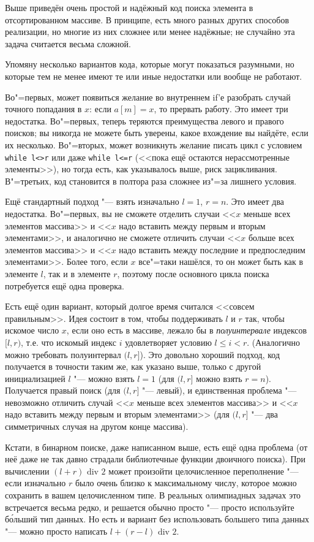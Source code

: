 \documentclass[a4paper,10pt]{problems}
\begin{document}
Выше приведён очень простой и надёжный код поиска элемента в отсортированном массиве.
В принципе, есть много разных других способов реализации, но многие из них сложнее
или менее надёжные; не случайно эта задача считается весьма сложной.

Упомяну несколько вариантов кода, которые могут показаться разумными, но которые тем не менее 
имеют те или иные недостатки или вообще не работают.

Во"=первых, может появиться желание во внутреннем if'е разобрать случай точного попадания в $x$:
если $a[m]=x$, то прервать работу. Это имеет три недостатка. 
Во"=первых, теперь теряются преимущества левого и правого поисков; вы никогда не можете
быть уверены, какое вхождение вы найдёте, если их несколько.
Во"=вторых, может возникнуть желание писать цикл с условием \verb`while l<>r` или даже
\verb`while l<=r` (<<пока ещё остаются нерассмотренные элементы>>), 
но тогда есть, как указывалось выше, риск зацикливания.
В"=третьих, код становится в полтора раза сложнее из"=за лишнего условия.

Ещё стандартный подход "--- взять изначально $l=1$, $r=n$. Это имеет два недостатка. 
Во"=первых, вы не сможете отделить случаи <<$x$ меньше всех элементов массива>> и 
<<$x$ надо вставить между первым и вторым элементами>>, 
и аналогично не сможете отличить случаи <<$x$ больше всех элементов массива>> и 
<<$x$ надо вставить между последние и предпоследним элементами>>.
Более того, если $x$ все"=таки нашёлся, то он может быть как в элементе $l$,
так и в элементе $r$, поэтому после основного цикла поиска потребуется ещё одна проверка.

Есть ещё один вариант, который долгое время считался <<совсем правильным>>. 
Идея состоит в том, чтобы поддерживать $l$ и $r$ так, чтобы искомое число $x$, 
если оно есть в массиве, лежало бы в \textit{полуинтервале} индексов $[l,r)$,
т.е. что искомый индекс $i$ удовлетворяет условию $l\leq i<r$.
(Аналогично можно требовать полуинтервал $(l,r]$).
Это довольно хороший подход, код получается в точности таким же, 
как указано выше, только с другой инициализацией $l$ "--- можно взять $l=1$
(для $(l,r]$ можно взять $r=n$).
Получается правый поиск (для $(l,r]$ "--- левый), и единственная проблема
"--- невозможно отличить случай <<$x$ меньше всех элементов массива>> и 
<<$x$ надо вставить между первым и вторым элементами>>
(для $(l,r]$ "--- два симметричных случая на другом конце массива).

Кстати, в бинарном поиске, даже написанном выше, есть ещё одна проблема 
(от неё даже не так давно страдали библиотечные функции двоичного поиска).
При вычислении $(l+r)\mbox{ div }2$ может произойти целочисленное переполнение "---
если изначально $r$ было очень близко к максимальному числу, которое можно
сохранить в вашем целочисленном типе. 
В реальных олимпиадных задачах это встречается весьма редко, и решается 
обычно просто "--- просто используйте б\'{о}льший тип данных.
Но есть и вариант без использовать большего типа данных
"--- можно просто написать $l+(r-l)\mbox{ div } 2$.
\end{document}
